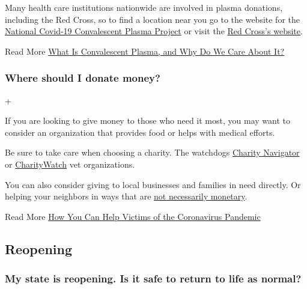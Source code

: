 Many health care institutions nationwide are involved in plasma
donations, including the Red Cross, so to find a location near you go to
the website for the \href{https://ccpp19.org/}{National Covid-19
Convalescent Plasma Project} or visit the
\href{https://www.redcrossblood.org/donate-blood/dlp/plasma-donations-from-recovered-covid-19-patients.html}{Red
Cross's website}.

 Read More
\href{https://www.nytimes.com/2020/04/24/smarter-living/coronavirus-convalescent-plasma-antibodies.html}{What
Is Convalescent Plasma, and Why Do We Care About It?}

\hypertarget{where-should-i-donate-money}{%
\subsubsection{Where should I donate
money?}\label{where-should-i-donate-money}}

+

If you are looking to give money to those who need it most, you may want
to consider an organization that provides food or helps with medical
efforts.

Be sure to take care when choosing a charity. The watchdogs
\href{https://www.charitynavigator.org/index.cfm?bay=content.view\&cpid=7779\&mod=article_inline}{Charity
Navigator} or
\href{https://www.charitywatch.org/charity-donating-articles/coronavirus-outbreak?mod=article_inline}{CharityWatch}
vet organizations.

You can also consider giving to local businesses and families in need
directly. Or helping your neighbors in ways that are
\href{https://www.nytimes.com/2020/03/15/smarter-living/wirecutter/5-ways-to-help-during-coronavirus-while-social-distancing.html}{not
necessarily monetary}.

 Read More
\href{https://www.nytimes.com/article/coronavirus-how-to-help-donations-charities.html}{How
You Can Help Victims of the Coronavirus Pandemic}

\hypertarget{reopening}{%
\subsection{Reopening}\label{reopening}}

\hypertarget{my-state-is-reopening-is-it-safe-to-return-to-life-as-normal}{%
\subsubsection{My state is reopening. Is it safe to return to life as
normal?}\label{my-state-is-reopening-is-it-safe-to-return-to-life-as-normal}}

